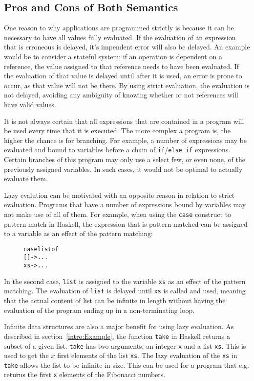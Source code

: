 \subsection{Pros and Cons of Both Semantics}
One reason to why applications are programmed strictly is because it can be
necessary to have all values fully evaluated. If the evaluation of an expression
that is erroneous is delayed, it's impendent error will also be delayed.
An example would be to consider a stateful system; if an operation is dependent
on a reference, the value assigned to that reference needs to have been
evaluated. If the evaluation of that value is delayed until after it is used,
an error is prone to occur, as that value will not be there.
By using strict evaluation, the evaluation is not delayed, avoiding any
ambiguity of knowing whether or not references will have valid values.

It is not always certain that all expressions that are contained in a program
will be used every time that it is executed. The more complex a program is, the
higher the chance is for branching. For example, a number of expressions may
be evaluated and bound to variables before a chain of
\texttt{if}/\texttt{else if} expressions. Certain branches of this program may
only use a select few, or even none, of the previously assigned variables.
In such cases, it would not be optimal to actually evaluate them.

Lazy evalution can be motivated with an opposite reason in relation to strict
evaluation. Programs that have a number of expressions bound by variables may
not make use of all of them. For example, when using the \texttt{case} construct
to pattern match in Haskell, the expression that is pattern matched can be
assigned to a variable as an effect of the pattern matching:

\begin{figure}[H]
\begin{alltt}
  case list of
    [] -> ...
    xs -> ...
\end{alltt}
\end{figure}

\noindent In the second case, \texttt{list} is assigned to the variable
\texttt{xs} as an effect of the pattern matching. The evaluation of
\texttt{list} is delayed until \texttt{xs} is called and used, meaning
that the actual content of list can be infinite in length without having the
evaluation of the program ending up in a non-terminating loop.

Infinite data structures are also a major benefit for using lazy evaluation.
As described in section~\ref{intro:Example}, the function \texttt{take}
in Haskell returns a subset of a given list. \texttt{take} has two arguments,
an integer \texttt{x} and a list \texttt{xs}. This is used to get the
$x$ first elements of the list \texttt{xs}. The lazy evaluation of the
\texttt{xs} in \texttt{take} allows the list to be infinite in size. This
can be used for a program that e.g. returns the first \texttt{x} elements of
the Fibonacci numbers.


